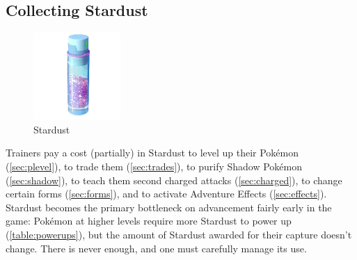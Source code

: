 \subsection{Collecting Stardust}
\label{subsec:getdust}
\begin{figure}
  \center
  \includegraphics[scale=.5]{images/stardust.png}
  \caption{Stardust}
\end{figure}
Trainers pay a cost (partially) in Stardust
  to level up their Pokémon (\autoref{sec:plevel}),
  to trade them (\autoref{sec:trades}),
  to purify Shadow Pokémon (\autoref{sec:shadow}),
  to teach them second charged attacks (\autoref{sec:charged}),
  to change certain forms (\autoref{sec:forms}),
  and to activate Adventure Effects (\autoref{sec:effects}).
Stardust becomes the primary bottleneck on advancement fairly early in the game:
  Pokémon at higher levels require more Stardust to power up (\autoref{table:powerups}),
  but the amount of Stardust awarded for their capture doesn't change.
There is never enough, and one must carefully manage its use.

